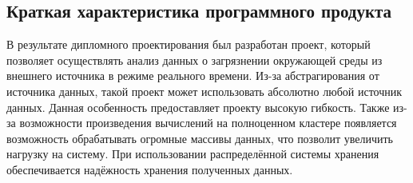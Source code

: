 
\FPeval{\valtchp}{\valtchr}









\subsection{Краткая характеристика программного продукта}

В результате дипломного проектирования был разработан проект, который позволяет осуществлять анализ данных о загрязнении окружающей среды из внешнего источника в режиме реального времени.
Из-за абстрагирования от источника данных, такой проект может использовать абсолютно любой источник данных.
Данная особенность предоставляет проекту высокую гибкость.
Также из-за возможности произведения вычислений на полноценном кластере появляется возможность обрабатывать огромные массивы данных, что позволит увеличить нагрузку на систему.
При использовании распределённой системы хранения обеспечивается надёжность хранения полученных данных.

